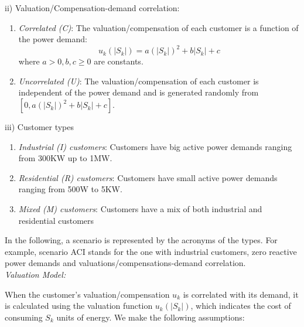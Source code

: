 \noindent
ii) Valuation/Compensation-demand correlation:
\begin{enumerate}

\item {\em Correlated (C)}: The valuation/compensation of each customer is a function of the power demand:
\begin{equation}\label{eq:valuationfunction}
u_k({|S_k|}) = a({|S_k|})^2 + b{|S_k|} + c 
\end{equation}
where $a > 0, b, c \ge 0$ are constants.

\item {\em Uncorrelated (U)}: The valuation/compensation of each customer is independent of the power demand and is generated randomly from $[0, a({|S_k|})^2 + b{|S_k|} + c]$.

\end{enumerate}

\noindent
iii) Customer types
\begin{enumerate}

\item {\em Industrial (I) customers}: Customers have big active power demands ranging from 300KW up to 1MW.

\item {\em Residential (R) customers}: Customers have small active power demands ranging from 500W to 5KW.

\item {\em Mixed (M) customers}: Customers have a mix of both industrial and residential customers

\end{enumerate}
In the following, a scenario is represented by the acronyms of the types. For example, scenario ACI stands for the one with industrial customers, zero reactive power demands and valuations/compensations-demand correlation.\\

\iffalse
{\em Valuation Model:} 

When the customer's valuation/compensation $u_k$ is correlated with its demand, it is calculated using the valuation function $u_k(|S_k|)$, which indicates the cost of consuming $S_k$ units of energy. We make the following assumptions:\\

